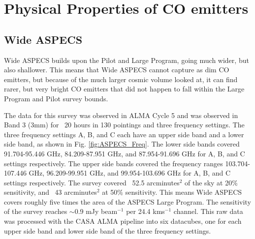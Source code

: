 \chapter{Physical Properties of CO emitters}

\section{Wide ASPECS}

Wide ASPECS builds upon the Pilot and Large Program, going much wider, but also shallower. This means that Wide ASPECS cannot capture as dim CO emitters, but because of the much larger cosmic volume looked at, it can find rarer, but very bright CO emitters that did not happen to fall within the Large Program and Pilot survey bounds.

The data for this survey was observed in ALMA Cycle 5 and was observed in Band 3 (3mm) for ~20 hours in 130 pointings and three frequency settings. The three frequency settings A, B, and C each have an upper side band and a lower side band, as shown in Fig. \ref{fig:ASPECS_Freq}. The lower side bands covered 91.704-95.446 GHz, 84.209-87.951 GHz, and 87.954-91.696 GHz for A, B, and C settings respectively. The upper side bands covered the frequency ranges 103.704-107.446 GHz, 96.209-99.951 GHz, and 99.954-103.696 GHz for A, B, and C settings respectively. The survey covered ~52.5 arcminutes$^2$ of the sky at 20\% sensitivity, and ~43 arcminutes$^2$ at 50\% sensitivity. This means Wide ASPECS covers roughly five times the area of the ASPECS Large Program. The sensitivity of the survey reaches $\sim$0.9 mJy beam$^{-1}$ per 24.4 kms$^{-1}$ channel. This raw data was processed with the CASA ALMA pipeline into six datacubes, one for each upper side band and lower side band of the three frequency settings.

